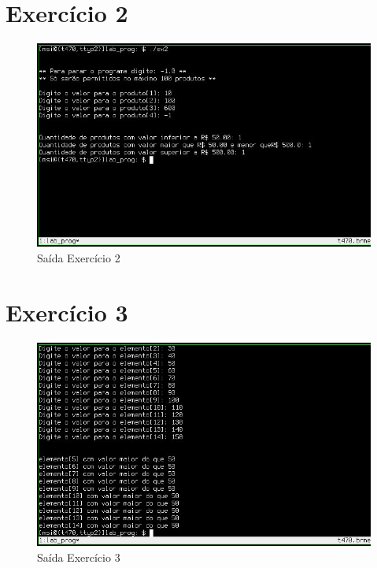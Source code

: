 \documentclass[12pt,a4paper]{article}
\let\oldsection\section
\renewcommand\section{\clearpage\oldsection}
\begin{document}
\section{Exercício 2}

\begin{figure}[htb!]
	\centering
	\includegraphics[width=16cm]{ex2}
	\caption{Saída Exercício 2}
	\label{fig:2}
\end{figure}

\section{Exercício 3}

\begin{figure}[htb!]
	\centering
	\includegraphics[width=16cm]{ex3}
	\caption{Saída Exercício 3}
	\label{fig:3}
\end{figure}
\end{document}
